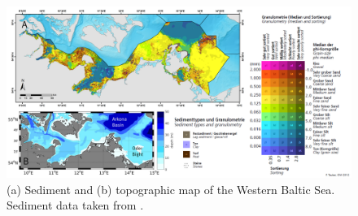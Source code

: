 \begin{figure}[ht]
 \flushleft
 \includegraphics[width=16cm]{bilder/sediment.pdf}
 \caption{(a) Sediment and (b) topographic map of the Western Baltic 
Sea. Sediment data taken from \citep[][]{tauber2012}.}\label{westernbaltic}
\end{figure}